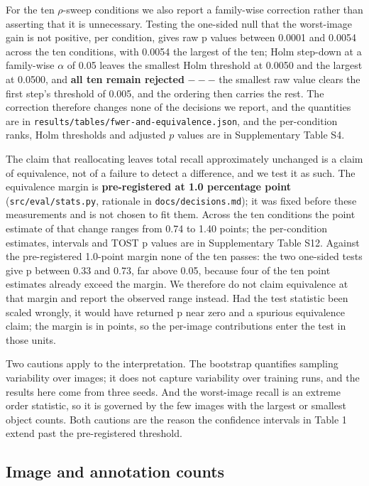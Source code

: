 \documentclass[sn-mathphys,Numbered]{sn-jnl}
\begin{document}
For the ten $\rho$-sweep conditions we also report a family-wise correction rather than asserting that it is unnecessary. Testing the one-sided null that the worst-image gain is not positive, per condition, gives raw p values between 0.0001 and 0.0054 across the ten conditions, with 0.0054 the largest of the ten; Holm step-down \cite{holm1979} at a family-wise $\alpha$ of 0.05 leaves the smallest Holm threshold at 0.0050 and the largest at 0.0500, and \textbf{all ten remain rejected} $---$ the smallest raw value clears the first step's threshold of 0.005, and the ordering then carries the rest. The correction therefore changes none of the decisions we report, and the quantities are in \texttt{results/tables/fwer-and-equivalence.json}, and the per-condition ranks, Holm thresholds and adjusted $p$ values are in Supplementary Table S4.

The claim that reallocating leaves total recall approximately unchanged is a claim of equivalence, not of a failure to detect a difference, and we test it as such. The equivalence margin is \textbf{pre-registered at 1.0 percentage point} (\texttt{src/eval/stats.py}, rationale in \texttt{docs/decisions.md}); it was fixed before these measurements and is not chosen to fit them. Across the ten conditions the point estimate of that change ranges from 0.74 to 1.40 points; the per-condition estimates, intervals and TOST p values are in Supplementary Table S12. Against the pre-registered 1.0-point margin none of the ten passes: the two one-sided tests give p between 0.33 and 0.73, far above 0.05, because four of the ten point estimates already exceed the margin. We therefore do not claim equivalence at that margin and report the observed range instead. Had the test statistic been scaled wrongly, it would have returned p near zero and a spurious equivalence claim; the margin is in points, so the per-image contributions enter the test in those units.

Two cautions apply to the interpretation. The bootstrap quantifies sampling variability over images; it does not capture variability over training runs, and the results here come from three seeds. And the worst-image recall is an extreme order statistic, so it is governed by the few images with the largest or smallest object counts. Both cautions are the reason the confidence intervals in Table 1 extend past the pre-registered threshold.

\subsection{Image and annotation counts}
\end{document}
